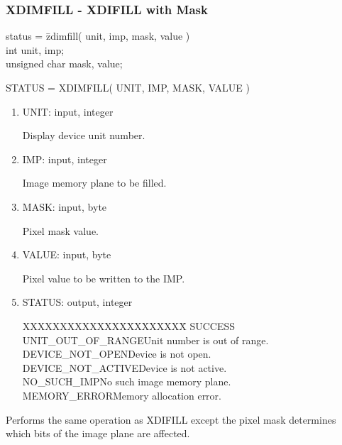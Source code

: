 \subsubsection{XDIMFILL - XDIFILL with Mask}
\begin{tabbing}
status = \=zdimfill( unit, imp, mask, value )\\
\>int  unit, imp;\\
\>unsigned char  mask, value;\\
\end{tabbing}
STATUS = XDIMFILL( UNIT, IMP, MASK, VALUE )
\begin{enumerate}
\item UNIT:  input, integer

Display device unit number.
\item IMP:  input, integer

Image memory plane to be filled.
\item MASK:  input, byte

Pixel mask value.
\item VALUE:  input, byte

Pixel value to be written to the IMP.
\item STATUS:  output, integer
\begin{tabbing}
XXXXXXXXXXXXXXXXXXXXXX\=\kill
SUCCESS\\
UNIT\_OUT\_OF\_RANGE\>Unit number is out of range.\\
DEVICE\_NOT\_OPEN\>Device is not open.\\
DEVICE\_NOT\_ACTIVE\>Device is not active.\\
NO\_SUCH\_IMP\>No such image memory plane.\\
MEMORY\_ERROR\>Memory allocation error.\\
\end{tabbing}
\end{enumerate}
Performs the same operation as XDIFILL except the pixel mask
determines which bits of the image plane are affected.
\newpage
